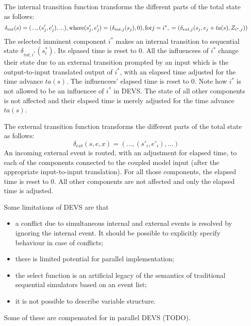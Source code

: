 The internal transition function transforms the different parts of the total state as follows:
\begin{equation}
    \delta_{int}(s) = (..., (s'_j, e'_j),...), \text{where} \\
    (s'_j, e'_j) = (\delta_{int, j} (s_j), 0), \text{for} j = i^*, \\
                 = (\delta_{ext, j} (s_j, e_j + ta(s), Z_{i^*, j}))
\end{equation}
The selected imminent component $i^*$ makes an internal transition to sequential state $\delta_{int, i^*} (s_i^*)$. Its elpased 
time is reset to 0. All the influencees of $i^*$ change their state due to an external transition prompted by an input which is 
the output-to-input translated output of $i^*$, with an elapsed time adjusted for the time advance $ta(s)$. The influencees' 
elapsed time is reset to 0. Note how $i^*$ is not allowed to be an influencee of $i^*$ in DEVS. The state of all other components 
is not affected and their elapsed time is merely adjusted for the time advance $ta(s)$.

The external transition function transforms the different parts of the total state as follows:
\begin{equation}
    \delta_{ext}(s,e,x) = (..., (s'_i, e'_i), ...)
\end{equation}
An incoming external event is routed, with an adjustment for elapsed time, to each of the components connected to the coupled 
model input (after the appropriate input-to-input translation). For all those components, the elapsed time is reset to 0. All 
other components are not affected and only the elapsed time is adjusted.

Some limitations of DEVS are that
\begin{itemize}
    \item a conflict due to simultaneous internal and external events is resolved by ignoring the internal event. It should be 
    possible to explicitly specify behaviour in case of conflicts;
    \item there is limited potential for parallel implementation;
    \item the select function is an artificial legacy of the semantics of traditional sequential simulators based on an event 
    list;
    \item it is not possible to describe variable structure.
\end{itemize}
Some of these are compensated for in parallel DEVS (TODO).

